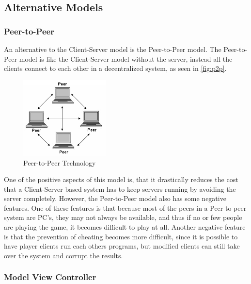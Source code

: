 \subsection{Alternative Models}

\subsubsection{Peer-to-Peer}
An alternative to the Client-Server model is the Peer-to-Peer model. The Peer-to-Peer model is like the Client-Server model without the server, instead all the clients connect to each other in a decentralized system, as seen in \autoref{fig:p2p}.

\begin{figure}[h]
  \centering
    \includegraphics[width=0.4\textwidth]{img/p2p.jpg}
  \caption{Peer-to-Peer Technology \citep{PeerToPeer}}
  \label{fig:p2p}
\end{figure}

One of the positive aspects of this model is, that it drastically reduces the cost that a Client-Server based system has to keep servers running by avoiding the server completely. However, the Peer-to-Peer model also has some negative features. One of these features is that because most of the peers in a Peer-to-peer system are PC's, they may not always be available, and thus if no or few people are playing the game, it becomes difficult to play at all. Another negative feature is that the prevention of cheating becomes more difficult, since it is possible to have player clients run each others programs, but modified clients can still take over the system and corrupt the results.\newline

\subsubsection{Model View Controller}
